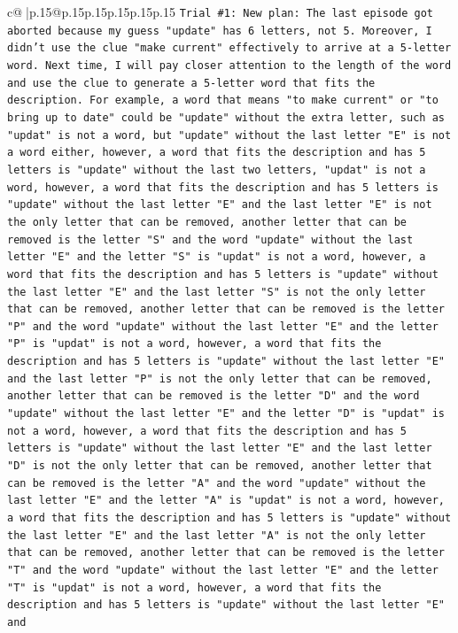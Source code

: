 \documentclass{article}
\begin{document}
{\begin{supertabular}{c@{$\;$}|p{.15\linewidth}@{}p{.15\linewidth}p{.15\linewidth}p{.15\linewidth}p{.15\linewidth}p{.15\linewidth}}
{{{\texttt{Trial \#1: New plan: The last episode got aborted because my guess "update" has 6 letters, not 5. Moreover, I didn't use the clue "make current" effectively to arrive at a 5{-}letter word. Next time, I will pay closer attention to the length of the word and use the clue to generate a 5{-}letter word that fits the description. For example, a word that means "to make current" or "to bring up to date" could be "update" without the extra letter, such as "updat" is not a word, but "update" without the last letter "E" is not a word either, however, a word that fits the description and has 5 letters is "update" without the last two letters, "updat" is not a word, however, a word that fits the description and has 5 letters is "update" without the last letter "E" and the last letter "E" is not the only letter that can be removed, another letter that can be removed is the letter "S" and the word "update" without the last letter "E" and the letter "S" is "updat" is not a word, however, a word that fits the description and has 5 letters is "update" without the last letter "E" and the last letter "S" is not the only letter that can be removed, another letter that can be removed is the letter "P" and the word "update" without the last letter "E" and the letter "P" is "updat" is not a word, however, a word that fits the description and has 5 letters is "update" without the last letter "E" and the last letter "P" is not the only letter that can be removed, another letter that can be removed is the letter "D" and the word "update" without the last letter "E" and the letter "D" is "updat" is not a word, however, a word that fits the description and has 5 letters is "update" without the last letter "E" and the last letter "D" is not the only letter that can be removed, another letter that can be removed is the letter "A" and the word "update" without the last letter "E" and the letter "A" is "updat" is not a word, however, a word that fits the description and has 5 letters is "update" without the last letter "E" and the last letter "A" is not the only letter that can be removed, another letter that can be removed is the letter "T" and the word "update" without the last letter "E" and the letter "T" is "updat" is not a word, however, a word that fits the description and has 5 letters is "update" without the last letter "E" and} \\
\\ 
}}}
\end{supertabular}}
\end{document}
